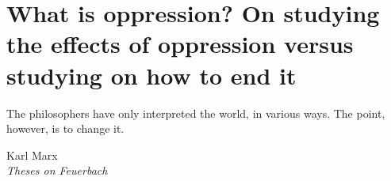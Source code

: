 \chapter{What is oppression? On studying the effects of oppression versus studying on how to end it}
    \epigraph{The philosophers have only interpreted the world, in various ways. The point, however, is to change it.}{Karl Marx\\ \textit{Theses on Feuerbach}}